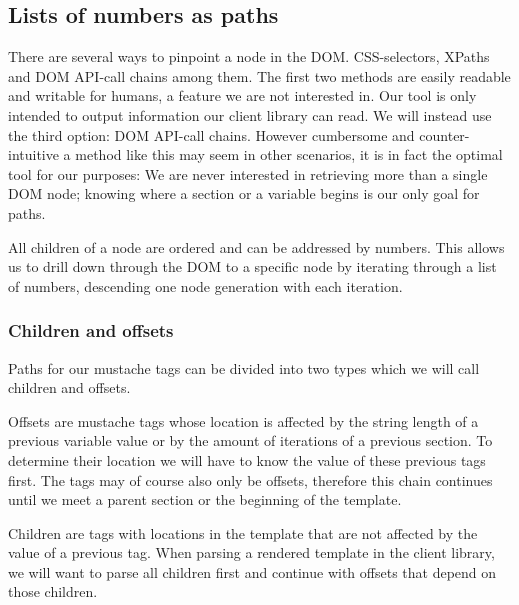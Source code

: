 \documentclass[thesis.tex]{subfiles}
\begin{document}
\subsection{Lists of numbers as paths}
There are several ways to pinpoint a node in the DOM. CSS-selectors, XPaths and
DOM API-call chains among them. The first two methods are easily
readable and writable for humans, a feature we are not interested in.
Our tool is only intended to output information our client library can read.
We will instead use the third option: DOM API-call chains. However cumbersome
and counter-intuitive a method like this may seem in other scenarios, it is
in fact the optimal tool for our purposes: We are never interested in retrieving
more than a single DOM node; knowing where a section or a variable begins is our
only goal for paths.

All children of a node are ordered and can be addressed by numbers. This allows
us to drill down through the DOM to a specific node by iterating through a list
of numbers, descending one node generation with each iteration.

\subsubsection{Children and offsets}
\label{sec:children-offsets}
Paths for our mustache tags can be divided into two types which we will call
children and offsets.

Offsets are mustache tags whose location is affected by the string length of a
previous variable value or by the amount of iterations of a previous section.
To determine their location we will have to know the value of these previous
tags first. The tags may of course also only be offsets, therefore this chain
continues until we meet a parent section or the beginning of the template.

Children are tags with locations in the template that are not affected by
the value of a previous tag.
When parsing a rendered template in the client library, we will want to parse
all children first and continue with offsets that depend on those children.
\end{document}
